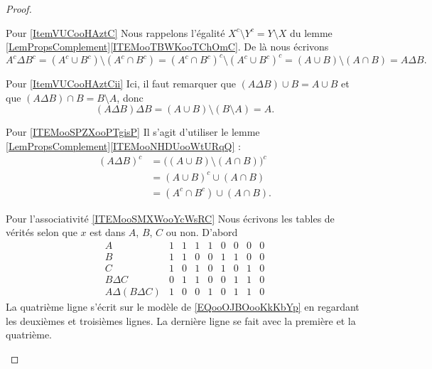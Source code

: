 \begin{proof}

    \begin{subproof}
    \item[Pour \ref{ItemVUCooHAztC}]
    Nous rappelons l'égalité \( X^c\setminus Y^c=Y\setminus X\) du lemme \ref{LemPropsComplement}\ref{ITEMooTBWKooTChOmC}. De là nous écrivons
    \begin{equation}
        A^c\Delta B^c=(A^c\cup B^c)\setminus(A^c\cap B^c)=(A^c\cap B^c)^c\setminus(A^c\cup B^c)^c=(A\cup B)\setminus (A\cap B)=A\Delta B.
    \end{equation}
\item[Pour \ref{ItemVUCooHAztCii}]
    Ici, il faut remarquer que \( (A\Delta B)\cup B=A\cup B\) et que \( (A\Delta B)\cap B=B\setminus A\), donc
    \begin{equation}
        (A\Delta B)\Delta B=(A\cup B)\setminus (B\setminus A)=A.
    \end{equation}

\item[Pour \ref{ITEMooSPZXooPTgisP}]
    Il s'agit d'utiliser le lemme \ref{LemPropsComplement}\ref{ITEMooNHDUooWtURqQ} :
    \begin{subequations}
        \begin{align}
            (A\Delta B)^c&=\Big( (A\cup B)\setminus (A\cap B) \Big)^c\\
            &=(A\cup B)^c\cup(A\cap B)\\
            &=(A^c\cap B^c)\cup(A\cap B).
        \end{align}
    \end{subequations}
\item[Pour l'associativité \ref{ITEMooSMXWooYcWsRC}]
           Nous écrivons les tables de vérités selon que \( x\) est dans \( A\), \( B\), \( C\) ou non. D'abord
           \begin{equation}
               \begin{array}{|c|c|c|c|c|c|c|c|c|}
                   A&1&1&1&1&0&0&0&0\\
                   B&1&1&0&0&1&1&0&0\\
                   C&1&0&1&0&1&0&1&0\\
                   \hline%
           B\Delta C&0&1&1&0&0&1&1&0\\
           \hline%
A\Delta (B\Delta C) &1&0&0&1&0&1&1&0     
               \end{array}
           \end{equation}
           La quatrième ligne s'écrit sur le modèle de \eqref{EQooOJBOooKkKbYp} en regardant les deuxièmes et troisièmes lignes. La dernière ligne se fait avec la première et la quatrième.


\end{subproof}
\end{proof}

